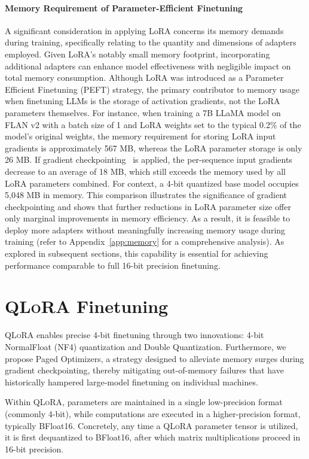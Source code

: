 \paragraph{Memory Requirement of Parameter-Efficient Finetuning} A significant consideration in applying LoRA concerns its memory demands during training, specifically relating to the quantity and dimensions of adapters employed. Given LoRA’s notably small memory footprint, incorporating additional adapters can enhance model effectiveness with negligible impact on total memory consumption. Although LoRA was introduced as a Parameter Efficient Finetuning (PEFT) strategy, the primary contributor to memory usage when finetuning LLMs is the storage of activation gradients, not the LoRA parameters themselves. For instance, when training a 7B LLaMA model on FLAN v2 with a batch size of 1 and LoRA weights set to the typical 0.2\% of the model’s original weights\citep{hu2021lora,liu2022few}, the memory requirement for storing LoRA input gradients is approximately 567 MB, whereas the LoRA parameter storage is only 26 MB. If gradient checkpointing~\citep{chen2016training} is applied, the per-sequence input gradients decrease to an average of 18 MB, which still exceeds the memory used by all LoRA parameters combined. For context, a 4-bit quantized base model occupies 5,048 MB in memory. This comparison illustrates the significance of gradient checkpointing and shows that further reductions in LoRA parameter size offer only marginal improvements in memory efficiency. As a result, it is feasible to deploy more adapters without meaningfully increasing memory usage during training (refer to Appendix~\ref{app:memory} for a comprehensive analysis). As explored in subsequent sections, this capability is essential for achieving performance comparable to full 16-bit precision finetuning.

\section{\textsc{QLoRA} Finetuning}

\textsc{QLoRA} enables precise 4-bit finetuning through two innovations: 4-bit NormalFloat (NF4) quantization and Double Quantization. Furthermore, we propose Paged Optimizers, a strategy designed to alleviate memory surges during gradient checkpointing, thereby mitigating out-of-memory failures that have historically hampered large-model finetuning on individual machines.

Within \textsc{QLoRA}, parameters are maintained in a single low-precision format (commonly 4-bit), while computations are executed in a higher-precision format, typically BFloat16. Concretely, any time a \textsc{QLoRA} parameter tensor is utilized, it is first dequantized to BFloat16, after which matrix multiplications proceed in 16-bit precision.

